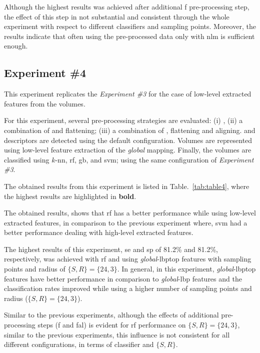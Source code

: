 Although the highest results was achieved after additional \ac{f} pre-processing step, the effect of this step in not substantial and consistent through the whole experiment with respect to different classifiers and sampling points.
Moreover, the results indicate that often using the pre-processed data only with \ac{nlm} is sufficient enough.




\subsection{Experiment \#4}\label{subsec:exp4}
%
%
%
%

This experiment replicates the \emph{Experiment \#3} for the case of low-level extracted features from the volumes.

For this experiment, several pre-processing strategies are evaluated: (i) \nlm, (ii) a combination of \nlm and flattening; (iii) a combination of \nlm, flattening and aligning.
\lbp and \lbptop descriptors are detected using the default configuration.
Volumes are represented using low-level feature extraction of the \emph{global} mapping.
Finally, the volumes are classified using $k$-\ac{nn}, \ac{rf}, \ac{gb}, and \ac{svm}; using the same configuration of \emph{Experiment \#3}.

The obtained results from this experiment is listed in Table.~\ref{tab:table4}, where the highest results are highlighted in \textbf{bold}.


The obtained results, shows that \ac{rf} has a better performance while using low-level extracted features, in comparison to the previous experiment where, \ac{svm} had a better performance dealing with high-level extracted features.

The highest results of this experiment, \ac{se} and \ac{sp} of 81.2\% and 81.2\%, respectively, was achieved with \ac{rf} and using \emph{global}-\ac{lbptop} features with sampling points and radius of $\{S,R\}=\{24,3\}$.
In general, in this experiment, \emph{global}-\ac{lbptop} features have better performance in comparison to \emph{global}-\ac{lbp} features and the  classification rates improved while using a higher number of sampling points and radius ($\{S,R\}=\{24,3\}$).

Similar to the previous experiments, although the effects of additional pre-processing steps (\ac{f} and \ac{fal}) is evident for \ac{rf} performance on $\{S,R\} = \{24,3\}$, similar to the previous experiments, this influence is not consistent for all different configurations, in terms of classifier and $\{S,R\}$.







